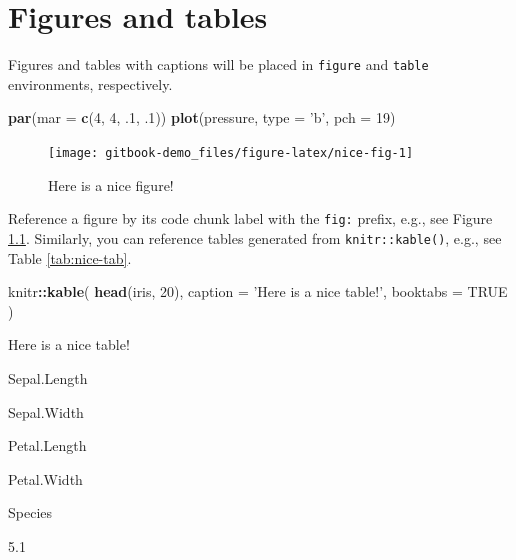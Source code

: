 \documentclass[
]{book}
\newenvironment{Shaded}{\begin{snugshade}}{\end{snugshade}}
\newcommand{\DataTypeTok}[1]{\textcolor[rgb]{0.13,0.29,0.53}{#1}}
\newcommand{\DecValTok}[1]{\textcolor[rgb]{0.00,0.00,0.81}{#1}}
\newcommand{\FloatTok}[1]{\textcolor[rgb]{0.00,0.00,0.81}{#1}}
\newcommand{\KeywordTok}[1]{\textcolor[rgb]{0.13,0.29,0.53}{\textbf{#1}}}
\newcommand{\NormalTok}[1]{#1}
\newcommand{\OperatorTok}[1]{\textcolor[rgb]{0.81,0.36,0.00}{\textbf{#1}}}
\newcommand{\OtherTok}[1]{\textcolor[rgb]{0.56,0.35,0.01}{#1}}
\newcommand{\StringTok}[1]{\textcolor[rgb]{0.31,0.60,0.02}{#1}}
\begin{document}
\hypertarget{figtab}{%
\chapter{Figures and tables}\label{figtab}}

Figures and tables with captions will be placed in \texttt{figure} and \texttt{table} environments, respectively.

\begin{Shaded}
\begin{Highlighting}[]
\KeywordTok{par}\NormalTok{(}\DataTypeTok{mar =} \KeywordTok{c}\NormalTok{(}\DecValTok{4}\NormalTok{, }\DecValTok{4}\NormalTok{, }\FloatTok{.1}\NormalTok{, }\FloatTok{.1}\NormalTok{))}
\KeywordTok{plot}\NormalTok{(pressure, }\DataTypeTok{type =} \StringTok{'b'}\NormalTok{, }\DataTypeTok{pch =} \DecValTok{19}\NormalTok{)}
\end{Highlighting}
\end{Shaded}

\begin{figure}

{\centering \texttt{[image: gitbook-demo\_files/figure-latex/nice-fig-1]} 

}

\caption{Here is a nice figure!}\label{fig:nice-fig}
\end{figure}

Reference a figure by its code chunk label with the \texttt{fig:} prefix, e.g., see Figure \ref{fig:nice-fig}. Similarly, you can reference tables generated from \texttt{knitr::kable()}, e.g., see Table \ref{tab:nice-tab}.

\begin{Shaded}
\begin{Highlighting}[]
\NormalTok{knitr}\OperatorTok{::}\KeywordTok{kable}\NormalTok{(}
  \KeywordTok{head}\NormalTok{(iris, }\DecValTok{20}\NormalTok{), }\DataTypeTok{caption =} \StringTok{'Here is a nice table!'}\NormalTok{,}
  \DataTypeTok{booktabs =} \OtherTok{TRUE}
\NormalTok{)}
\end{Highlighting}
\end{Shaded}

\label{tab:nice-tab}Here is a nice table!

Sepal.Length

Sepal.Width

Petal.Length

Petal.Width

Species

5.1
\end{document}
